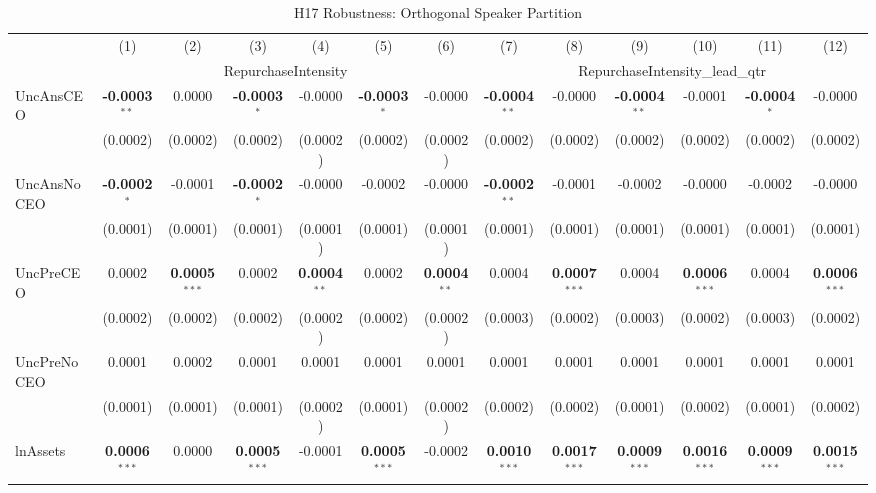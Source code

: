 \begin{landscape}
\begin{table}[H]
\setlength{\tabcolsep}{3pt}
\renewcommand{\arraystretch}{0.85}
\centering
\caption{H17 Robustness: Orthogonal Speaker Partition}
\label{tab:h17_robust}
\scriptsize
\begin{tabular}{lcccccccccccc}
\toprule
 & (1) & (2) & (3) & (4) & (5) & (6) & (7) & (8) & (9) & (10) & (11) & (12) \\
 & \multicolumn{6}{c}{RepurchaseIntensity} & \multicolumn{6}{c}{RepurchaseIntensity\_lead\_qtr} \\
\cmidrule(lr){2-7} \cmidrule(lr){8-13}
\midrule
UncAnsCEO & \textbf{-0.0003}$^{**}$ & 0.0000 & \textbf{-0.0003}$^{*}$ & -0.0000 & \textbf{-0.0003}$^{*}$ & -0.0000 & \textbf{-0.0004}$^{**}$ & -0.0000 & \textbf{-0.0004}$^{**}$ & -0.0001 & \textbf{-0.0004}$^{*}$ & -0.0000 \\
 & (0.0002) & (0.0002) & (0.0002) & (0.0002) & (0.0002) & (0.0002) & (0.0002) & (0.0002) & (0.0002) & (0.0002) & (0.0002) & (0.0002) \\
UncAnsNoCEO & \textbf{-0.0002}$^{*}$ & -0.0001 & \textbf{-0.0002}$^{*}$ & -0.0000 & -0.0002 & -0.0000 & \textbf{-0.0002}$^{**}$ & -0.0001 & -0.0002 & -0.0000 & -0.0002 & -0.0000 \\
 & (0.0001) & (0.0001) & (0.0001) & (0.0001) & (0.0001) & (0.0001) & (0.0001) & (0.0001) & (0.0001) & (0.0001) & (0.0001) & (0.0001) \\
UncPreCEO & 0.0002 & \textbf{0.0005}$^{***}$ & 0.0002 & \textbf{0.0004}$^{**}$ & 0.0002 & \textbf{0.0004}$^{**}$ & 0.0004 & \textbf{0.0007}$^{***}$ & 0.0004 & \textbf{0.0006}$^{***}$ & 0.0004 & \textbf{0.0006}$^{***}$ \\
 & (0.0002) & (0.0002) & (0.0002) & (0.0002) & (0.0002) & (0.0002) & (0.0003) & (0.0002) & (0.0003) & (0.0002) & (0.0003) & (0.0002) \\
UncPreNoCEO & 0.0001 & 0.0002 & 0.0001 & 0.0001 & 0.0001 & 0.0001 & 0.0001 & 0.0001 & 0.0001 & 0.0001 & 0.0001 & 0.0001 \\
 & (0.0001) & (0.0001) & (0.0001) & (0.0002) & (0.0001) & (0.0002) & (0.0002) & (0.0002) & (0.0001) & (0.0002) & (0.0001) & (0.0002) \\
\midrule
lnAssets & \textbf{0.0006}$^{***}$ & 0.0000 & \textbf{0.0005}$^{***}$ & -0.0001 & \textbf{0.0005}$^{***}$ & -0.0002 & \textbf{0.0010}$^{***}$ & \textbf{0.0017}$^{***}$ & \textbf{0.0009}$^{***}$ & \textbf{0.0016}$^{***}$ & \textbf{0.0009}$^{***}$ & \textbf{0.0015}$^{***}$ \\

\end{tabular}
\end{table}
\end{landscape}
